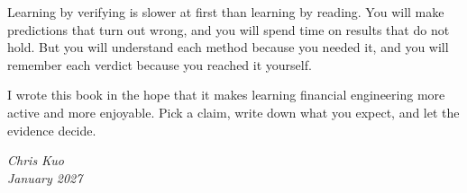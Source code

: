 Learning by verifying is slower at first than learning by reading. You will make predictions that turn out wrong, and you will spend time on results that do not hold. But you will understand each method because you needed it, and you will remember each verdict because you reached it yourself.

I wrote this book in the hope that it makes learning financial engineering more active and more enjoyable. Pick a claim, write down what you expect, and let the evidence decide.

\bigskip
\begin{flushright}
\emph{Chris Kuo}\\
\emph{January 2027}
\end{flushright}
